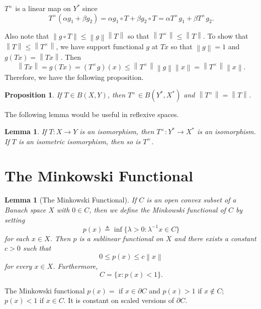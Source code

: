 \documentclass[12pt,a4paper]{report}
\numberwithin{equation}{section}
\theoremstyle{mystyle}
\newtheorem{lemma}[definition]{Lemma}
\newtheorem{proposition}[definition]{Proposition}
\newcommand{\norm}[1]{\left\lVert #1 \right\rVert}
\begin{document}
	$T^\times $ is a linear map on $Y^*$ since 
	$$
	T^\times (\alpha g_1+\beta g_2)=\alpha g_1 \circ T+\beta g_2 \circ T=\alpha T^\times g_1 +\beta T^\times g_2.
	$$
	
	Also note that $\norm{g\circ T}\leq \norm{g}\norm{T}$ so that $\norm{T^\times}\leq \norm{T}$. To show that $\norm{T}\leq \norm{T^\times}$, we have support functional $g$ at $Tx$ so that $\norm{g}=1$ and $g(Tx)=\norm{Tx}$. Then 
	$$
	\norm{Tx}=g(Tx)=(T^\times g )(x)\leq \norm{T^\times}\norm{g}\norm{x}=\norm{T^\times}\norm{x}.
	$$
	Therefore, we have the following proposition.
	\begin{proposition}
		If $T\in B(X,Y)$, then $T^\times\in B(Y^*,X^*)$ and $\norm{T^\times}=\norm{T}$.
	\end{proposition}
	
	The following lemma would be useful in reflexive spaces.
	\begin{lemma}
		If $T:X\to Y$ is an isomorphism, then $T^\times:Y^*\to X^*$ is an isomorphism. If $T$ is an isometric isomorphism, then so is $T^\times$.
	\end{lemma}
	
	\section{The Minkowski Functional}
	\begin{lemma}[The Minkowski Functional]
		If $C$ is an open convex subset of a Banach space $X$ with $0\in C$, then we define the \emph{Minkowski functional} of $C$ by setting
		\begin{equation}
			p(x)\triangleq \inf\{\lambda>0: \lambda^{-1}x\in C\}
		\end{equation}
		for each $x\in X$. Then $p$ is a sublinear functional on $X$ and there exists a constant $c>0$ such that
		\begin{equation}
			0\leq p(x)\leq c\norm{x}
		\end{equation}
		for every $x\in X$. Furthermore,
		\begin{equation}
			C=\{x:p(x)<1\}.
		\end{equation}
	\end{lemma}
	The Minkowski functional $p(x)= $ if $x\in \partial C$ and $p(x)>1$ if $x\notin C$; $p(x)<1$ if $x\in C$. It is constant on scaled versions of $\partial C$.
\end{document}

